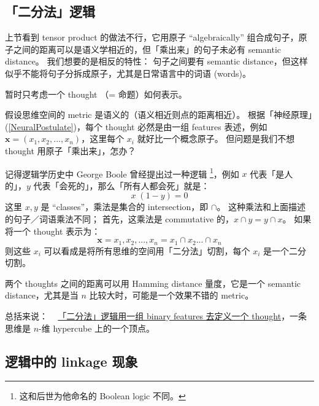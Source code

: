\documentclass[orivec]{llncs}
\newcommand{\vect}[1]{\boldsymbol{#1}}
\begin{document}

\subsection{「二分法」逻辑}

上节看到 tensor product 的做法不行，它用原子 ``algebraically'' 组合成句子，原子之间的距离可以是语义学相近的，但「乘出来」的句子未必有 semantic distance。 我们想要的是相反的特性： 句子之间要有 semantic distance，但这样似乎不能将句子分拆成原子，尤其是日常语言中的词语 (words)。

暂时只考虑一个 thought （= 命题）如何表示。

假设思维空间的 metric 是语义的（语义相近则点的距离相近）。 根据「神经原理」(\ref{NeuralPostulate})，每个 thought 必然是由一组 features 表述，例如 $\vect{x} = (x_1, x_2, ..., x_n)$，这里每个 $x_i$ 就好比一个概念原子。 但问题是我们不想 thought 用原子「乘出来」，怎办？

记得逻辑学历史中 George Boole 曾经提出过一种逻辑 \footnote{这和后世为他命名的 Boolean logic 不同。}，例如 $x$ 代表「是人的」，$y$ 代表「会死的」，那么「所有人都会死」就是：
\begin{equation}
x \; (1 - y) = 0
\end{equation}
这里 $x, y$ 是 ``classes''，乘法是集合的 intersection，即 $\cap$。 这种乘法和上面描述的句子／词语乘法不同； 首先，这乘法是 commutative 的，$x \cap y = y \cap x$。 如果将一个 thought 表示为：
\begin{equation}
\vect{x} = {x_1, x_2, ..., x_n} = x_1 \cap x_2 ... \cap x_n
\end{equation}
则这些 $x_i$ 可以看成是将所有思维的空间用「二分法」切割，每个 $x_i$ 是一个二分切割。 

两个 thoughts 之间的距离可以用 Hamming distance 量度，它是一个 semantic distance，尤其是当 $n$ 比较大时，可能是一个效果不错的 metric。 

总括来说： ~ \underline{「二分法」逻辑用一组 binary features 去定义一个 thought}，一条思维是 $n$-维 hypercube 上的一个顶点。


\subsection{逻辑中的 linkage 现象}
\end{document}
